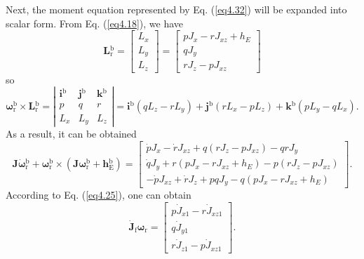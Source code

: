 Next, the moment equation represented by Eq. (\ref{eq4.32}) will be expanded into scalar form. From Eq. (\ref{eq4.18}), we have
\begin{equation}\label{4.33}
\mathbf{L}\mathrm{_r^b} = \left[ {\begin{array}{*{20}{c}}
	{{L_x}}\\
	{{L_y}}\\
	{{L_z}}
	\end{array}} \right] = \left[ {\begin{array}{*{20}{c}}
	{p{J_x} - r{J_{xz}} + {h_E}}\\
	{q{J_y}}\\
	{r{J_z} - p{J_{xz}}}
	\end{array}} \right]
\end{equation}
so
\begin{equation}\label{eq4.34}
\bm{\omega}\mathrm{_r^b} \times \mathbf{L}\mathrm{_r^b} = \left| {\begin{array}{*{20}{c}}
	{{\mathbf{i}\mathrm{^b}}}&{\mathbf{j}\mathrm{^b}}&{\mathbf{k}\mathrm{^b}}\\
	p&q&r\\
	{{L_x}}&{{L_y}}&{{L_z}}
	\end{array}} \right| = {\mathbf{i}\mathrm{^b}}\left( {q{L_z} - r{L_y}} \right) + {\mathbf{j}\mathrm{^b}}\left( {r{L_x} - p{L_z}} \right) + {\mathbf{k}\mathrm{^b}}\left( {p{L_y} - q{L_x}} \right) .
\end{equation}
As a result, it can be obtained
\begin{equation}\label{eq4.35}
\mathbf{J}\dot{\bm{\omega}}\mathrm{_r^b} + \bm{\omega}\mathrm{_r^b} \times \left( {\mathbf{J}\bm{\omega}\mathrm{_r^b} +\mathbf{ h}\mathrm{_E^b}} \right) = \left[ {\begin{array}{*{20}{c}}
	{\dot p{J_x} - \dot r{J_{xz}} + q\left( {r{J_z} - p{J_{xz}}} \right) - qr{J_y}}\\
	{\dot q{J_y} + r\left( {p{J_x} - r{J_{xz}} + {h_E}} \right) - p\left( {r{J_z} - p{J_{xz}}} \right)}\\
	{ - \dot p{J_{xz}} + \dot r{J_z} + pq{J_y} - q\left( {p{J_x} - r{J_{xz}} + {h_E}} \right)}
	\end{array}} \right] .
\end{equation}
According to Eq. (\ref{eq4.25}), one can obtain
\begin{equation}\label{eq4.36}
{\dot{ \mathbf{J}}\mathrm{_f}}{\bm{\omega}\mathrm{_r}} = \left[ {\begin{array}{*{20}{c}}
	{p{{\dot J}_{x1}} - r{{\dot J}_{xz1}}}\\
	{q{{\dot J}_{y1}}}\\
	{r{{\dot J}_{z1}} - p{{\dot J}_{xz1}}}
	\end{array}} \right] .
\end{equation}
